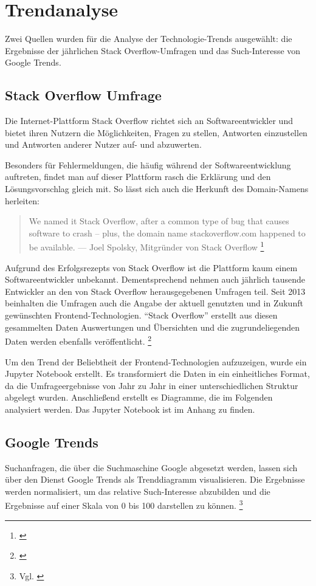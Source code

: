\section{Trendanalyse}
\label{sec:Trendanalyse}


Zwei Quellen wurden für die Analyse der Technologie-Trends ausgewählt: die Ergebnisse der jährlichen Stack Overflow-Umfragen und das Such-Interesse von Google Trends.

\subsection{Stack Overflow Umfrage}
Die Internet-Plattform Stack Overflow richtet sich an Softwareentwickler und bietet ihren Nutzern die Möglichkeiten, Fragen zu stellen, Antworten einzustellen und Antworten anderer Nutzer auf- und abzuwerten.

Besonders für Fehlermeldungen, die häufig während der Softwareentwicklung auftreten, findet man auf dieser Plattform rasch die Erklärung und den Lösungsvorschlag gleich mit.
So lässt sich auch die Herkunft des Domain-Namens herleiten:

\begin{quotation}
We named it Stack Overflow, after a common type of bug that causes software to crash -- plus, the domain name stackoverflow.com happened to be available. --- Joel Spolsky, Mitgründer von Stack Overflow \footnote{\cite{TheUnprovenPath}}
\end{quotation}

Aufgrund des Erfolgsrezepts von Stack Overflow ist die Plattform kaum einem Softwareentwickler unbekannt.
Dementsprechend nehmen auch jährlich tausende Entwickler an den von Stack Overflow herausgegebenen Umfragen teil.
Seit  2013 beinhalten die Umfragen auch die Angabe der aktuell genutzten und in Zukunft gewünschten Frontend-Technologien.
\enquote{Stack Overflow} erstellt aus diesen gesammelten Daten Auswertungen und Übersichten und die zugrundeliegenden Daten werden ebenfalls veröffentlicht.
\footnote{\cite{StackOverflowInsights}} 

Um den Trend der Beliebtheit der Frontend-Technologien aufzuzeigen, wurde ein Jupyter Notebook erstellt.
Es transformiert die Daten in ein einheitliches Format, da die  Umfrageergebnisse von Jahr zu Jahr in einer unterschiedlichen Struktur abgelegt wurden.
Anschließend erstellt es Diagramme, die im Folgenden analysiert werden.
Das Jupyter Notebook ist im  Anhang zu finden.

\subsection{Google Trends} Suchanfragen, die über die Suchmaschine Google abgesetzt werden, lassen sich  über den Dienst Google Trends  als Trenddiagramm visualisieren.
Die Ergebnisse werden normalisiert, um das relative Such-Interesse abzubilden und die Ergebnisse auf einer Skala von 0 bis 100 darstellen zu können.
\footnote{Vgl. \cite{GoogleTrendsHilfe}}

